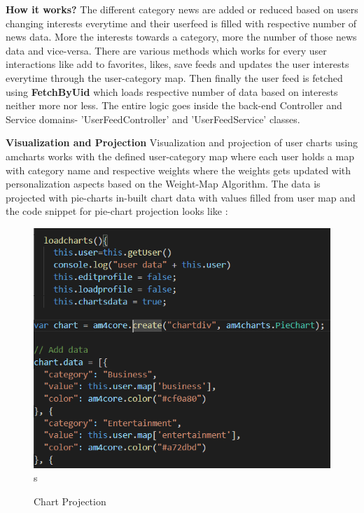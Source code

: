 \textbf{How it works?}
The different category news are added or reduced based on users changing interests everytime and their userfeed is filled with respective number of news data. More the interests towards a category, more the number of those news data and vice-versa. \newline
There are various methods which works for every user interactions like add to favorites, likes, save feeds and updates the user interests everytime through the user-category map. Then finally the user feed is fetched using \textbf{FetchByUid} which loads respective number of data based on interests neither more nor less.
The entire logic goes inside the back-end  Controller and Service domains- 'UserFeedController' and 'UserFeedService' classes. \newline


\textbf{Visualization and Projection}
Visualization and projection of user charts using amcharts works with the defined user-category map where each user holds a map with category name and respective weights where the weights gets updated with personalization aspects based on the Weight-Map Algorithm. 
The data is projected with pie-charts in-built chart data with values filled from user map and the code snippet for pie-chart projection looks like :

\begin{figure}[h!]
     \begin{center}
    \includegraphics[width = \linewidth]{images/chartdata.PNG}s 
  \end{center}
\centering \caption{Chart Projection}
\end{figure}

